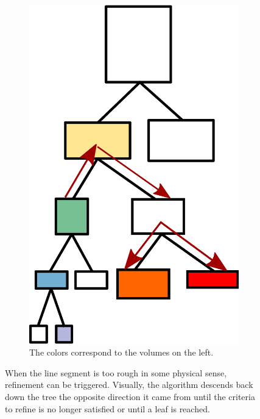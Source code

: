 \begin{figure}
\begin{subfigure}[b]{0.45\textwidth}
                \includegraphics[width=\textwidth]{graphics/refine_memory.eps}
                \caption{The colors correspond to the volumes on the left.}
                \label{fig:refinememory}
        \end{subfigure}
        \caption[Refinement during the absorption algorithm.]{When the line segment is too rough in some physical sense, refinement can be triggered. Visually, the algorithm descends back down the tree the opposite direction it came from until the criteria to refine is no longer satisfied or until a leaf is reached.}\label{fig:refining}
\end{figure}

